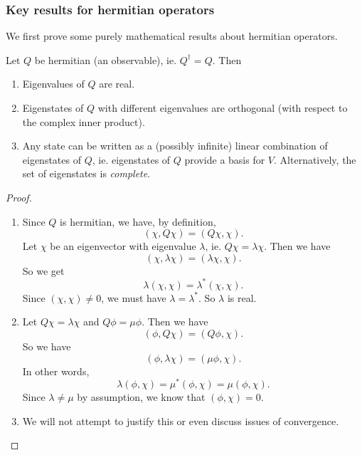 \documentclass[a4paper]{article}
\begin{document}
\subsubsection*{Key results for hermitian operators}
We first prove some purely mathematical results about hermitian operators.
\begin{prop}
  Let $Q$ be hermitian (an observable), ie. $Q^\dagger = Q$. Then
  \begin{enumerate}
    \item Eigenvalues of $Q$ are real.
    \item Eigenstates of $Q$ with different eigenvalues are orthogonal (with respect to the complex inner product).
    \item Any state can be written as a (possibly infinite) linear combination of eigenstates of $Q$, ie. eigenstates of $Q$ provide a basis for $V$. Alternatively, the set of eigenstates is \emph{complete}.
  \end{enumerate}
\end{prop}

\begin{proof}\leavevmode
  \begin{enumerate}
    \item Since $Q$ is hermitian, we have, by definition,
      \[
        (\chi, Q\chi) = (Q\chi, \chi).
      \]
      Let $\chi$ be an eigenvector with eigenvalue $\lambda$, ie. $Q\chi = \lambda \chi$. Then we have
      \[
        (\chi, \lambda \chi) = (\lambda \chi, \chi).
      \]
      So we get
      \[
        \lambda (\chi, \chi) = \lambda^*(\chi, \chi).
      \]
      Since $(\chi, \chi)\not= 0$, we must have $\lambda = \lambda^*$. So $\lambda$ is real.
    \item Let $Q \chi = \lambda \chi$ and $Q \phi = \mu \phi$. Then we have
      \[
        (\phi, Q\chi) = (Q\phi, \chi).
      \]
      So we have
      \[
        (\phi, \lambda\chi) = (\mu \phi, \chi).
      \]
      In other words,
      \[
        \lambda (\phi, \chi) = \mu^* (\phi, \chi) = \mu (\phi, \chi).
      \]
      Since $\lambda \not= \mu$ by assumption, we know that $(\phi, \chi) = 0$.
    \item We will not attempt to justify this or even discuss issues of convergence.
  \end{enumerate}
\end{proof}
\end{document}
